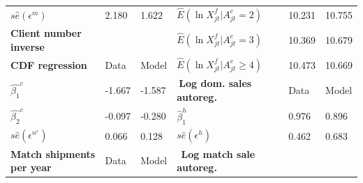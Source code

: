 \begin{table}
{\begin{tabular}{llllll}
        $s\widehat{e}(\epsilon ^{m})$                                                 & {2.180}                                        &
        {1.622}                                                                       & $\widehat{E}(\ln X_{jt}^{f}|A_{jt}^{c}=2)$     &
        {10.231}                                                                      & {10.755} \\
        \textbf{Client number inverse}                                                & {}                                             & {}
                                                                                      & $\widehat{E}(\ln X_{jt}^{f}|A_{jt}^{c}=3)$     & {10.369}      &
        {10.679} \\
        \textbf{CDF regression}                                                       & {Data}                                         & {Model
        }                                                                             & $\widehat{E}(\ln X_{jt}^{f}|A_{jt}^{c}\geq 4)$ & {
        10.473}                                                                       & {10.669} \\ \cline{1-3}
        $\widehat{\beta _{1}}^{c}$                                                    & {-1.667}                                       & {
        -1.587}                                                                       & $\ $\textbf{Log dom. sales autoreg.}           & {Data}        &
        {Model} \\ \cline{4-6}
        $\widehat{\beta _{2}}^{c}$                                                    & {-0.097}                                       & {
        -0.280}                                                                       & $\widehat{\beta }_{1}^{h}$                     & {0.976}       &
        {0.896} \\
        $s\widehat{e}(\epsilon ^{n^{c}})$                                             & {0.066}                                        &
        {0.128}                                                                       & $s\widehat{e}(\epsilon ^{h})$                  &
        {0.462}                                                                       & {0.683} \\
        \textbf{Match shipments per year}                                             & {Data}                                         &
        {Model}                                                                       & $\ \ $\textbf{Log match sale autoreg.}         &

\end{tabular}}
\end{table}
